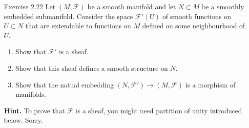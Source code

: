 \begin{thing4}{Exercise 2.22}\label{exer:2.22}\leavevmode
Let $(M,\mathcal{F})$ be a smooth manifold and let $N \subset M$ be a smoothly embedded submanifold. Consider the space $\mathcal{F}'(U)$ of smooth functions on $U \subset N$ that are extendable to functions on $M$ defined on some neighbourhood of $U$.
\begin{enumerate}[label=(\alph*)]
\item Show that $\mathcal{F}'$ is a sheaf.
\item  Show that this sheaf defines a smooth structure on $N$.
\item Show that the natual embedding $(N, \mathcal{F}') \to (M, \mathcal{F})$ is a morphism of manifolds.
\end{enumerate}
\textbf{Hint.} To prove that $\mathcal{F}$ is a sheaf, you might need partition of unity introduced below. Sorry.
\end{thing4}
